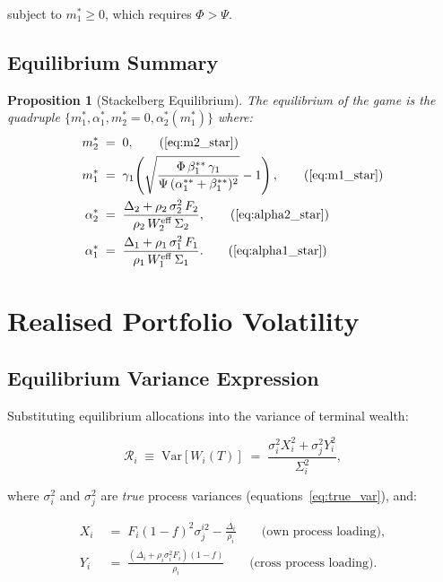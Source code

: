 \documentclass[12pt,a4paper]{article}
\newtheorem{proposition}{Proposition}[section]
\newcommand{\Var}{\mathrm{Var}}
\newcommand{\1}{\mathbf{1}}
\begin{document}
subject to $m_1^* \geq 0$, which requires $\Phi > \Psi$.

\subsection{Equilibrium Summary}

\begin{proposition}[Stackelberg Equilibrium]
The equilibrium of the game is the quadruple $\{m_1^*, \alpha_1^*, m_2^* = 0, \alpha_2^*(m_1^*)\}$ where:
\begin{align}
  m_2^* &\;=\; 0, \tag{\ref{eq:m2_star}}\\
  m_1^* &\;=\; \gamma_1\!\left(\sqrt{\dfrac{\Phi\,\beta_1^{**}\,\gamma_1}{\Psi\,(\alpha_1^{**}+\beta_1^{**})^2}} - 1\right), \tag{\ref{eq:m1_star}}\\
  \alpha_2^* &\;=\; \frac{\Delta_2 + \rho_2\,\sigma_2^2\,F_2}{\rho_2\,W_2^{\mathrm{eff}}\,\Sigma_2}, \tag{\ref{eq:alpha2_star}}\\
  \alpha_1^* &\;=\; \frac{\Delta_1 + \rho_1\,\sigma_1^2\,F_1}{\rho_1\,W_1^{\mathrm{eff}}\,\Sigma_1}. \tag{\ref{eq:alpha1_star}}
\end{align}
\end{proposition}

\section{Realised Portfolio Volatility}

\subsection{Equilibrium Variance Expression}

Substituting equilibrium allocations into the variance of terminal wealth:

\begin{equation}
  \mathcal{R}_i \;\equiv\; \Var[W_i(T)]
  \;=\; \frac{\sigma_i^2 X_i^2 + \sigma_j^2 Y_i^2}{\Sigma_i^2},
  \label{eq:realised_var}
\end{equation}

where $\sigma_i^2$ and $\sigma_j^2$ are \emph{true} process variances (equations~\eqref{eq:true_var}), and:

\begin{align}
  X_i &\;=\; F_i(1-f)^2\sigma_j^{i2} - \frac{\Delta_i}{\rho_i}
  \qquad\text{(own process loading)},
  \label{eq:Xi}\\
  Y_i &\;=\; \frac{(\Delta_i + \rho_i\sigma_i^2 F_i)(1-f)}{\rho_i}
  \qquad\text{(cross process loading)}.
  \label{eq:Yi}
\end{align}
\end{document}
